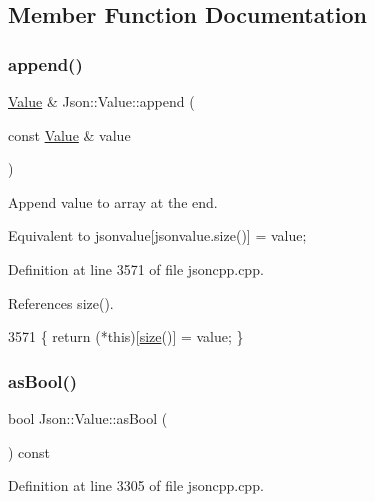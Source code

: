 \subsection{Member Function Documentation}
\mbox{\label{class_json_1_1_value_a7e49ac977e4bcf59745a09d426669f75}} 
\subsubsection{\texorpdfstring{append()}{append()}}
{\footnotesize\ttfamily \hyperlink{class_json_1_1_value}{Value} \& Json\+::\+Value\+::append (\begin{DoxyParamCaption}\item[{const \hyperlink{class_json_1_1_value}{Value} \&}]{value }\end{DoxyParamCaption})}



Append value to array at the end. 

Equivalent to jsonvalue\mbox{[}jsonvalue.\+size()\mbox{]} = value; 

Definition at line 3571 of file jsoncpp.\+cpp.



References size().


\begin{DoxyCode}
3571 \{ \textcolor{keywordflow}{return} (*\textcolor{keyword}{this})[\hyperlink{class_json_1_1_value_a0ec2808e1d7efa4e9fad938d6667be44}{size}()] = value; \}
\end{DoxyCode}
\mbox{\label{class_json_1_1_value_ab693fb7b9b1595bb0adc49658bbf780d}} 
\subsubsection{\texorpdfstring{as\+Bool()}{asBool()}}
{\footnotesize\ttfamily bool Json\+::\+Value\+::as\+Bool (\begin{DoxyParamCaption}{ }\end{DoxyParamCaption}) const}



Definition at line 3305 of file jsoncpp.\+cpp.



